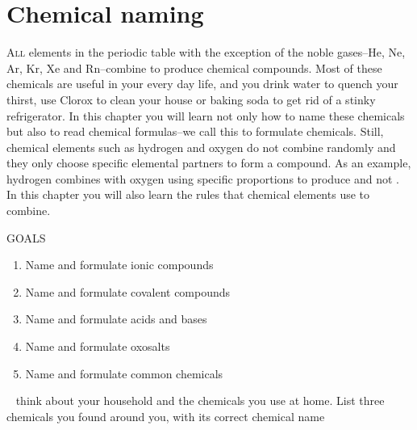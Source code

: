 \documentclass[main.tex]{subfiles}
\begin{document}
\linenumbers


\chapter[Chemical naming ]{Chemical naming}
\label{ch:naming}


   
            \begin{marginfigure}
\label{fig:naming1}
\end{marginfigure}
   
\lettrine[lines=4]{\color{black!45}A}{ll} elements in the periodic table with the exception of the noble gases--He, Ne, Ar, Kr, Xe and Rn--combine to produce chemical compounds. Most of these chemicals are useful in your every day life, and you drink water to quench your thirst, use Clorox to clean your house or baking soda to get rid of a stinky refrigerator. In this chapter you will learn not only how to name these chemicals but also to read chemical formulas--we call this to formulate chemicals. Still, chemical elements such as hydrogen and oxygen do not combine randomly and they only choose specific elemental partners to form a compound. As an example, hydrogen combines with oxygen using specific proportions to produce  and not . In this chapter you will also learn the rules that chemical elements use to combine.
\begin{marginfigure}%
\begin{mytcbox}{GOALS}
\begin{enumerate}[label=\protect\circled{\color{white}\arabic*}]
\item Name and formulate ionic compounds
\item Name and formulate covalent compounds
\item Name and formulate acids and bases 
\item Name and formulate oxosalts 
\item Name and formulate common chemicals
\end{enumerate}
\end{mytcbox}
\vspace{1cm}
\begin{tcolorbox}[enhanced,colback=red!5!white,colframe=black!50!red,boxrule=1pt,
  arc=0pt,outer arc=0pt,drop heavy lifted shadow]
\faGears\ 
 think about your household and the chemicals you use at home. List three chemicals you found around you, with its correct chemical name \end{tcolorbox}
\end{marginfigure}%
\end{document}
